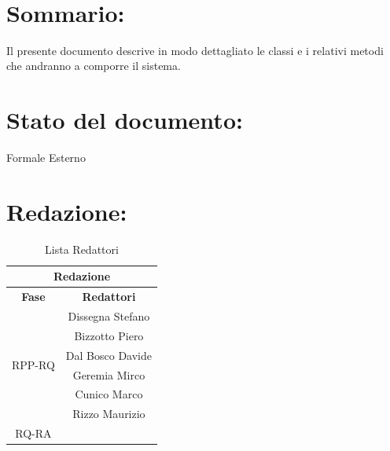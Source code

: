 \newpage

\begin{center} %
	\begin{Huge}	
				\textbf{\TITOLODOC}
			\\
	\end{Huge}
\end{center}

\section*{\LARGE Sommario:} %
Il presente documento descrive in modo dettagliato le classi e i relativi metodi che andranno a comporre il sistema.

\indent \indent

\section*{\LARGE Stato del documento:}
\indent \indent
	Formale Esterno

\section*{\LARGE Redazione:}
	\begin{table}[!h]
		\begin{center}
			\begin{tabular}
				{|c|c|}
				\hline
				\multicolumn{2}{|c|}{ \textbf{Redazione} } \\
				\hline
				\textbf{Fase} & \textbf{Redattori} \\
				\hline
				\multirow{6}{*}{RPP-RQ} 
				& Dissegna Stefano \\
				& Bizzotto Piero \\
				& Dal Bosco Davide \\
				& Geremia Mirco \\
				& Cunico Marco \\
				& Rizzo Maurizio \\
				
				\hline
				\multirow{1}{*}{RQ-RA} & \\
												
				\hline
			\end{tabular}
			\caption{Lista Redattori} %
			\label{tabredazione}
		\end{center}
	\end{table}
	
